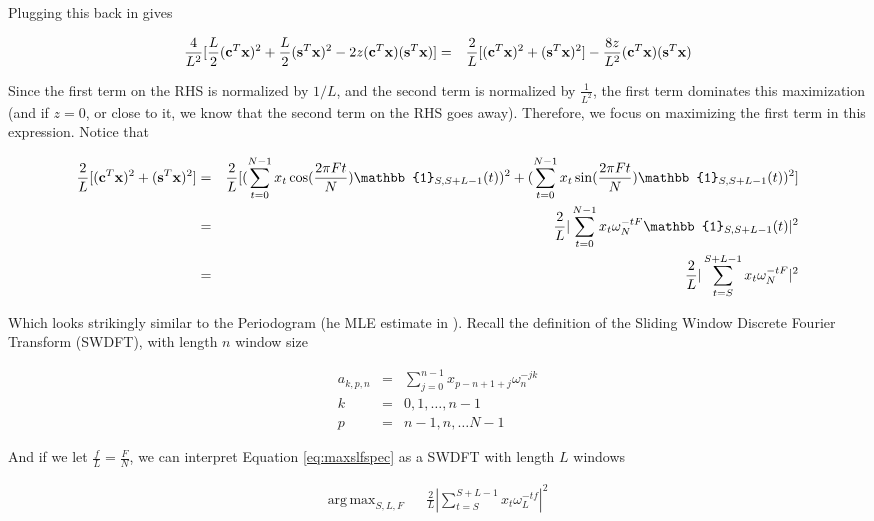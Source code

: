 \documentclass[11pt]{article}
\theoremstyle{plain}
\theoremstyle{definition}
\DeclareMathOperator*{\argmax}{arg\,max}
\begin{document}
\noindent Plugging this back in gives 

\begin{eqnarray}
	\frac{4}{L^2}[\frac{L}{2} ({\bf c}^T {\bf x})^2 + \frac{L}{2} ({\bf s}^T {\bf x})^2 - 2 z ({\bf c}^T {\bf x}) ({\bf s}^T {\bf x})] &=& \frac{2}{L}[({\bf c}^T {\bf x})^2 + ({\bf s}^T {\bf x})^2] - \frac{8z}{L^2} ({\bf c}^T {\bf x}) ({\bf s}^T {\bf x}) \nonumber 
\end{eqnarray}

\noindent Since the first term on the RHS is normalized by $1/L$, and the second term is normalized by $\frac{1}{L^2}$, the first term dominates this maximization (and if $z = 0$, or close to it, we know that the second term on the RHS goes away). Therefore, we focus on maximizing the first term in this expression. Notice that

\begin{eqnarray}
\label{eq:maxslfspec}
	\frac{2}{L} [ ({\bf c}^T {\bf x})^2 + ({\bf s}^T {\bf x})^2] &=& \frac{2}{L} [ (\sum_{t=0}^{N-1} x_t \cos(\frac{2 \pi F t}{N}) \mathbb{1}_{S,S+L-1}(t))^2 + (\sum_{t=0}^{N-1} x_t \sin(\frac{2 \pi F t}{N}) \mathbb{1}_{S,S+L-1}(t))^2]  \nonumber \\
	&=& \frac{2}{L} |\sum_{t=0}^{N-1} x_t \omega_N^{-tF} \mathbb{1}_{S,S+L-1}(t)|^2 \nonumber \\
	&=& \frac{2}{L} |\sum_{t=S}^{S+L-1} x_t \omega_N^{-tF}|^2
\end{eqnarray}

Which looks strikingly similar to the Periodogram (he MLE estimate in \cite{kay1993fundamentals}). Recall the definition of the Sliding Window Discrete Fourier Transform (SWDFT), with length $n$ window size

\begin{eqnarray}
\label{eq:swdft}
	a_{k, p, n} &=& \sum_{j=0}^{n-1} x_{p-n+1+j} \omega_n^{-jk} \nonumber \\
	k &=& 0, 1, \ldots, n - 1 \nonumber \\
	p &=& n - 1, n, \ldots N - 1 
\end{eqnarray}

\noindent And if we let $\frac{f}{L} = \frac{F}{N}$, we can interpret Equation \ref{eq:maxslfspec} as a SWDFT with length $L$ windows

\begin{eqnarray}
\label{eq:optimizationslf}
	\argmax_{S, L, F} && \frac{2}{L} |\sum_{t=S}^{S+L-1} x_t \omega_L^{-tf}|^2 \nonumber 
\end{eqnarray}
\end{document}
